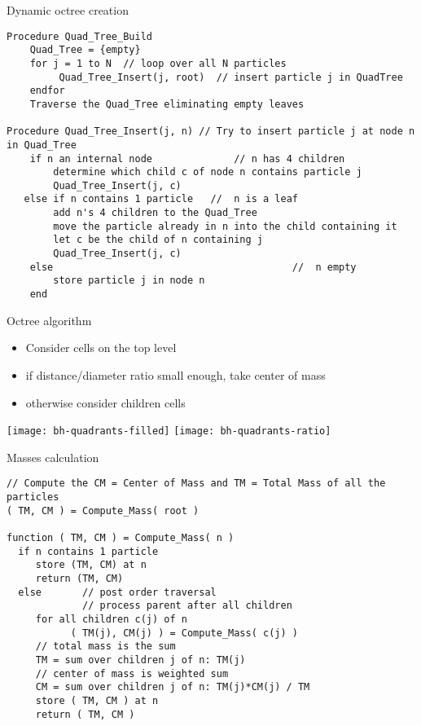 \begin{frame}[fragile]{Dynamic octree creation}
\verbatimsize
\begin{verbatim}
Procedure Quad_Tree_Build
    Quad_Tree = {empty}
    for j = 1 to N  // loop over all N particles
         Quad_Tree_Insert(j, root)  // insert particle j in QuadTree
    endfor
    Traverse the Quad_Tree eliminating empty leaves

Procedure Quad_Tree_Insert(j, n) // Try to insert particle j at node n in Quad_Tree
    if n an internal node              // n has 4 children
        determine which child c of node n contains particle j
        Quad_Tree_Insert(j, c)
   else if n contains 1 particle   //  n is a leaf
        add n's 4 children to the Quad_Tree
        move the particle already in n into the child containing it
        let c be the child of n containing j
        Quad_Tree_Insert(j, c)
    else                                         //  n empty 
        store particle j in node n
    end
\end{verbatim}
\end{frame}

\begin{frame}{Octree algorithm}
  \begin{itemize}
  \item Consider cells on the top level
  \item if distance/diameter ratio small enough, take center of mass
  \item otherwise consider children cells
  \end{itemize}
\end{frame}

\begin{frame}
  \texttt{[image: bh-quadrants-filled]}
  \texttt{[image: bh-quadrants-ratio]}
\end{frame}

\begin{frame}[fragile]{Masses calculation}
\verbatimsize
\begin{verbatim}
// Compute the CM = Center of Mass and TM = Total Mass of all the particles 
( TM, CM ) = Compute_Mass( root )

function ( TM, CM ) = Compute_Mass( n )
  if n contains 1 particle
     store (TM, CM) at n
     return (TM, CM)
  else       // post order traversal
             // process parent after all children
     for all children c(j) of n
           ( TM(j), CM(j) ) = Compute_Mass( c(j) )
     // total mass is the sum
     TM = sum over children j of n: TM(j)
     // center of mass is weighted sum
     CM = sum over children j of n: TM(j)*CM(j) / TM
     store ( TM, CM ) at n
     return ( TM, CM )
\end{verbatim}
\end{frame}

